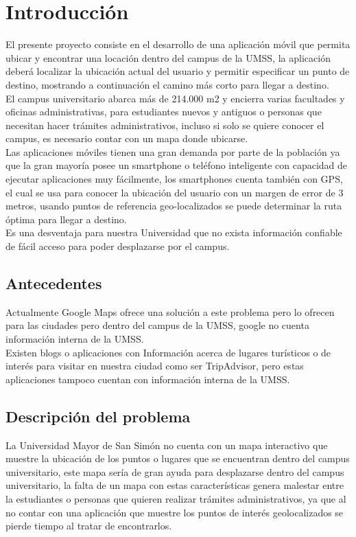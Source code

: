 \chapter{Introducci\'on} %
\label{cha:introduccion}

El presente proyecto consiste en el desarrollo de una aplicación móvil que
permita ubicar y encontrar una locación dentro del campus de la UMSS,
la aplicación deberá localizar la ubicación actual del usuario y permitir
especificar un punto de destino, mostrando a continuación el camino más corto
para llegar a destino.\\


El campus universitario abarca más de 214.000 m2 y encierra varias facultades y
oficinas administrativas, para estudiantes nuevos y antiguos o personas que
necesitan hacer trámites administrativos, incluso si solo se quiere conocer el
campus, es necesario contar con un mapa donde ubicarse.\\


Las aplicaciones móviles tienen una gran demanda por parte de la población ya
que la gran mayoría posee un smartphone o teléfono inteligente con capacidad de
ejecutar aplicaciones muy fácilmente, los smartphones cuenta también con GPS,
el cual se usa para conocer la ubicación del usuario con un margen de error de
3 metros, usando puntos de referencia geo-localizados se puede determinar la
ruta óptima para llegar a destino.\\


Es una desventaja para nuestra Universidad que no exista información confiable
de fácil acceso para poder desplazarse por el campus.\\

  \section{Antecedentes} %
  \label{sec:antecedentes}
  Actualmente Google Maps ofrece una solución a este problema pero lo ofrecen
  para las ciudades pero dentro del campus de la UMSS, google no cuenta
  información interna de la UMSS.\\


  Existen blogs o aplicaciones con Información acerca de lugares turísticos o
  de interés para visitar en nuestra ciudad como ser TripAdvisor, pero estas
  aplicaciones tampoco cuentan con información interna de la UMSS.\\


  \section{Descripción del problema} %
  \label{sec:desc_probl}
  La Universidad Mayor de San Simón no cuenta con un mapa interactivo que
  muestre la ubicación de los puntos o lugares que se encuentran dentro del
  campus universitario, este mapa sería de gran ayuda para desplazarse dentro
  del campus universitario, la falta de un mapa con estas características
  genera malestar entre la estudiantes o personas que quieren realizar trámites
  administrativos, ya que al no contar con una aplicación que muestre los puntos de interés  geolocalizados se pierde tiempo al tratar de encontrarlos.


